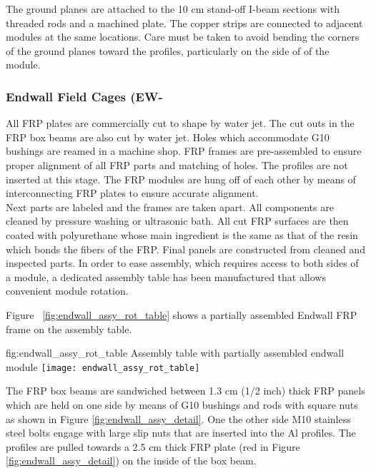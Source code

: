 The ground planes are attached to the 10 cm stand-off I-beam sections with threaded rods and a machined plate. The copper strips are connected to adjacent modules at the same locations. Care must be taken to avoid bending the corners of the ground planes toward the profiles, particularly on the  side of of the module.

\subsubsection{Endwall Field Cages (EW-}

All FRP plates are commercially cut to shape by water jet. The cut outs in the FRP box beams are also cut by water jet. Holes which accommodate G10 bushings are reamed in a machine shop. FRP frames are pre-assembled to ensure proper alignment of all FRP parts and matching of holes. The profiles are not inserted at this stage. The FRP modules are hung off of each other by means of interconnecting FRP plates to ensure accurate alignment.\\

Next  parts are labeled and the frames are taken apart. All components are cleaned by pressure washing or ultrasonic bath. All cut FRP surfaces are then coated with polyurethane whose main ingredient is the same as that of the resin which bonds
the fibers of the FRP. Final panels are constructed from cleaned and inspected parts. In order to ease assembly, which requires access to both sides of a module,
a dedicated assembly table has been manufactured that allows convenient module rotation. 

Figure ~\ref{fig:endwall_assy_rot_table} shows a partially assembled  Endwall FRP frame on the assembly table.

\begin{dunefigure}{fig:endwall_assy_rot_table}{ Assembly table with partially assembled  endwall module}
 \texttt{[image: endwall\_assy\_rot\_table]}
 \end{dunefigure}
 
The FRP box beams are sandwiched between 1.3 cm (1/2 inch) thick FRP panels which are held on one side by means of G10 bushings and rods with square nuts
as shown in Figure \ref{fig:endwall_assy_detail}. One the other side M10 stainless steel bolts engage with large slip nuts that are inserted into the Al profiles. The profiles 
are pulled towards a 2.5 cm thick FRP plate (red in Figure \ref{fig:endwall_assy_detail}) on the inside of the box beam.

